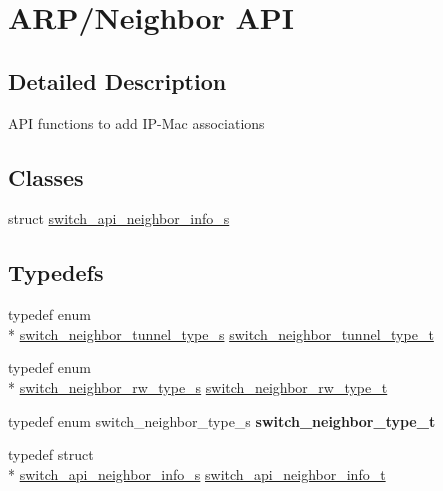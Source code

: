 \hypertarget{group__ARP}{\section{A\+R\+P/\+Neighbor A\+P\+I}
\label{group__ARP}
}


\subsection{Detailed Description}
A\+P\+I functions to add I\+P-\/\+Mac associations \subsection*{Classes}
\begin{DoxyCompactItemize}
\item 
struct \hyperlink{structswitch__api__neighbor__info__s}{switch\+\_\+api\+\_\+neighbor\+\_\+info\+\_\+s}
\end{DoxyCompactItemize}
\subsection*{Typedefs}
\begin{DoxyCompactItemize}
\item 
typedef enum \\*
\hyperlink{group__ARP_gae636aa9c208e60064eb6c68c707537f7}{switch\+\_\+neighbor\+\_\+tunnel\+\_\+type\+\_\+s} \hyperlink{group__ARP_gaf9904c6d66d51eba396e678466e3ef45}{switch\+\_\+neighbor\+\_\+tunnel\+\_\+type\+\_\+t}
\item 
typedef enum \\*
\hyperlink{group__ARP_ga731fa1e12488772adc0b26c05c6b7b1c}{switch\+\_\+neighbor\+\_\+rw\+\_\+type\+\_\+s} \hyperlink{group__ARP_gac9c559935317c4845662f75ef6f8fa3a}{switch\+\_\+neighbor\+\_\+rw\+\_\+type\+\_\+t}
\item 
\hypertarget{group__ARP_gac943cd03cbfbea16e60c2472637d09a4}{typedef enum switch\+\_\+neighbor\+\_\+type\+\_\+s {\bfseries switch\+\_\+neighbor\+\_\+type\+\_\+t}}\label{group__ARP_gac943cd03cbfbea16e60c2472637d09a4}

\item 
typedef struct \\*
\hyperlink{structswitch__api__neighbor__info__s}{switch\+\_\+api\+\_\+neighbor\+\_\+info\+\_\+s} \hyperlink{group__ARP_gabec2e5422f9b1b796d495f8b9bbd7bc9}{switch\+\_\+api\+\_\+neighbor\+\_\+info\+\_\+t}
\end{DoxyCompactItemize}
